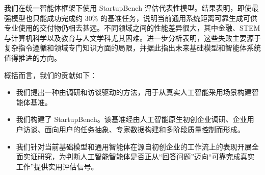 我们在统一智能体框架下使用 StartupBench 评估代表性模型。结果表明，即使最强模型也只能成功完成约 30\% 的基准任务，说明当前通用系统距离可靠生成可供专业使用的交付物仍相去甚远。不同领域之间的性能差异很大，其中金融、STEM 与计算机科学以及教育与人文学科尤其困难。进一步分析表明，这些失败主要源于复杂指令遵循和领域专门知识方面的局限，并据此指出未来基础模型和智能体系统值得推进的方向。

概括而言，我们的贡献如下：

\begin{itemize}
    \item 我们提出一种由调研和访谈驱动的方法，用于从真实人工智能采用场景构建智能体基准。
    \item 我们构建了 StartupBench。该基准经由人工智能原生初创企业调研、企业用户访谈、面向用户的任务抽象、专家数据构建和多阶段质量控制而形成。
    \item 我们针对当前基础模型和通用智能体在源自初创企业的工作流上的表现开展全面实证研究，为判断人工智能智能体是否正从“回答问题”迈向“可靠完成真实工作”提供实用评估信号。
\end{itemize}
